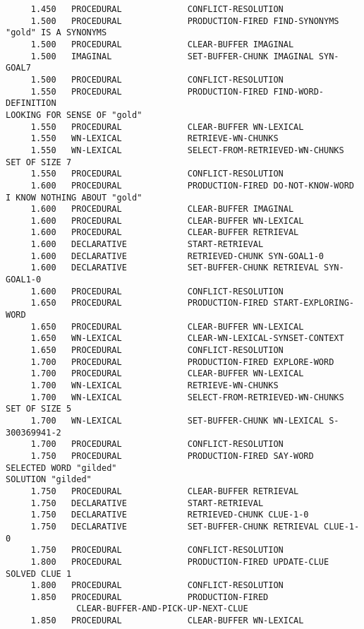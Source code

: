 \begin{verbatim}
     1.450   PROCEDURAL             CONFLICT-RESOLUTION 
     1.500   PROCEDURAL             PRODUCTION-FIRED FIND-SYNONYMS 
"gold" IS A SYNONYMS 
     1.500   PROCEDURAL             CLEAR-BUFFER IMAGINAL 
     1.500   IMAGINAL               SET-BUFFER-CHUNK IMAGINAL SYN-GOAL7 
     1.500   PROCEDURAL             CONFLICT-RESOLUTION 
     1.550   PROCEDURAL             PRODUCTION-FIRED FIND-WORD-DEFINITION 
LOOKING FOR SENSE OF "gold" 
     1.550   PROCEDURAL             CLEAR-BUFFER WN-LEXICAL 
     1.550   WN-LEXICAL             RETRIEVE-WN-CHUNKS 
     1.550   WN-LEXICAL             SELECT-FROM-RETRIEVED-WN-CHUNKS SET OF SIZE 7 
     1.550   PROCEDURAL             CONFLICT-RESOLUTION 
     1.600   PROCEDURAL             PRODUCTION-FIRED DO-NOT-KNOW-WORD 
I KNOW NOTHING ABOUT "gold" 
     1.600   PROCEDURAL             CLEAR-BUFFER IMAGINAL 
     1.600   PROCEDURAL             CLEAR-BUFFER WN-LEXICAL 
     1.600   PROCEDURAL             CLEAR-BUFFER RETRIEVAL 
     1.600   DECLARATIVE            START-RETRIEVAL 
     1.600   DECLARATIVE            RETRIEVED-CHUNK SYN-GOAL1-0 
     1.600   DECLARATIVE            SET-BUFFER-CHUNK RETRIEVAL SYN-GOAL1-0 
     1.600   PROCEDURAL             CONFLICT-RESOLUTION 
     1.650   PROCEDURAL             PRODUCTION-FIRED START-EXPLORING-WORD 
     1.650   PROCEDURAL             CLEAR-BUFFER WN-LEXICAL 
     1.650   WN-LEXICAL             CLEAR-WN-LEXICAL-SYNSET-CONTEXT 
     1.650   PROCEDURAL             CONFLICT-RESOLUTION 
     1.700   PROCEDURAL             PRODUCTION-FIRED EXPLORE-WORD 
     1.700   PROCEDURAL             CLEAR-BUFFER WN-LEXICAL 
     1.700   WN-LEXICAL             RETRIEVE-WN-CHUNKS 
     1.700   WN-LEXICAL             SELECT-FROM-RETRIEVED-WN-CHUNKS SET OF SIZE 5 
     1.700   WN-LEXICAL             SET-BUFFER-CHUNK WN-LEXICAL S-300369941-2 
     1.700   PROCEDURAL             CONFLICT-RESOLUTION 
     1.750   PROCEDURAL             PRODUCTION-FIRED SAY-WORD 
SELECTED WORD "gilded" 
SOLUTION "gilded" 
     1.750   PROCEDURAL             CLEAR-BUFFER RETRIEVAL 
     1.750   DECLARATIVE            START-RETRIEVAL 
     1.750   DECLARATIVE            RETRIEVED-CHUNK CLUE-1-0 
     1.750   DECLARATIVE            SET-BUFFER-CHUNK RETRIEVAL CLUE-1-0 
     1.750   PROCEDURAL             CONFLICT-RESOLUTION 
     1.800   PROCEDURAL             PRODUCTION-FIRED UPDATE-CLUE 
SOLVED CLUE 1 
     1.800   PROCEDURAL             CONFLICT-RESOLUTION 
     1.850   PROCEDURAL             PRODUCTION-FIRED 
              CLEAR-BUFFER-AND-PICK-UP-NEXT-CLUE 
     1.850   PROCEDURAL             CLEAR-BUFFER WN-LEXICAL 

\end{verbatim}
